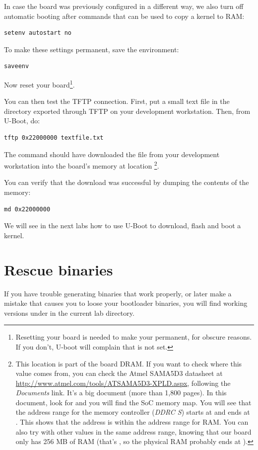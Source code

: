 In case the board was previously configured in a different way, we
also turn off automatic booting after commands that can be used to
copy a kernel to RAM:

\begin{verbatim}
setenv autostart no
\end{verbatim}

To make these settings permanent, save the environment:

\begin{verbatim}
saveenv
\end{verbatim}

Now reset your board\footnote{Resetting your board is needed to
make your  permanent, for obscure reasons. If you
don't, U-boot will complain that  is not
set.}.

You can then test the TFTP connection. First, put a small text file in
the directory exported through TFTP on your development
workstation. Then, from U-Boot, do:

\begin{verbatim}
tftp 0x22000000 textfile.txt
\end{verbatim}

The  command should have downloaded the
 file from your development workstation into
the board's memory at location \footnote{
This location is part of the board DRAM. If you want
to check where this value comes from, you can check the Atmel SAMA5D3
datasheet at \url{http://www.atmel.com/tools/ATSAMA5D3-XPLD.aspx}, 
following the {\em Documents} link. It's a big document (more than 1,800
pages). In this document, look for  and you
will find the SoC memory map. You will see that the address range for
the memory controller ({\em DDRC S}) starts at 
and ends at . This shows that the  
address is within the address range for RAM. You can also try with other
values in the same address range, knowing that our board only has 256 MB
of RAM (that's , so the physical RAM probably ends at
).}.

You can verify that the download was successful by dumping the
contents of the memory:

\begin{verbatim}
md 0x22000000
\end{verbatim}

We will see in the next labs how to use U-Boot to download, flash and
boot a kernel.

\section{Rescue binaries}

If you have trouble generating binaries that work properly, or later
make a mistake that causes you to loose your bootloader binaries, you
will find working versions under  in the current lab
directory.
